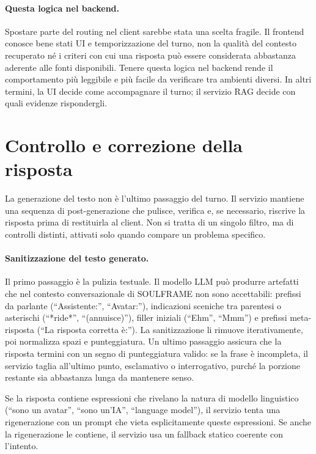 \paragraph{Questa logica nel backend.}
Spostare parte del routing nel client sarebbe stata una scelta fragile. Il frontend conosce bene stati UI e temporizzazione del turno, non la qualità del contesto recuperato né i criteri con cui una risposta può essere considerata abbastanza aderente alle fonti disponibili. Tenere questa logica nel backend rende il comportamento più leggibile e più facile da verificare tra ambienti diversi. In altri termini, la UI decide come accompagnare il turno; il servizio RAG decide con quali evidenze rispondergli.

\section{Controllo e correzione della risposta}

La generazione del testo non è l'ultimo passaggio del turno. Il servizio mantiene una sequenza di post-generazione che pulisce, verifica e, se necessario, riscrive la risposta prima di restituirla al client. Non si tratta di un singolo filtro, ma di controlli distinti, attivati solo quando compare un problema specifico.

\paragraph{Sanitizzazione del testo generato.}

Il primo passaggio è la pulizia testuale. Il modello LLM può produrre artefatti che nel contesto conversazionale di SOULFRAME non sono accettabili: prefissi da parlante (``Assistente:'', ``Avatar:''), indicazioni sceniche tra parentesi o asterischi (``*ride*'', ``(annuisce)''), filler iniziali (``Ehm'', ``Mmm'') e prefissi meta-risposta (``La risposta corretta è:''). La sanitizzazione li rimuove iterativamente, poi normalizza spazi e punteggiatura. Un ultimo passaggio assicura che la risposta termini con un segno di punteggiatura valido: se la frase è incompleta, il servizio taglia all'ultimo punto, esclamativo o interrogativo, purché la porzione restante sia abbastanza lunga da mantenere senso.

Se la risposta contiene espressioni che rivelano la natura di modello linguistico (``sono un avatar'', ``sono un'IA'', ``language model''), il servizio tenta una rigenerazione con un prompt che vieta esplicitamente queste espressioni. Se anche la rigenerazione le contiene, il servizio usa un fallback statico coerente con l'intento.

